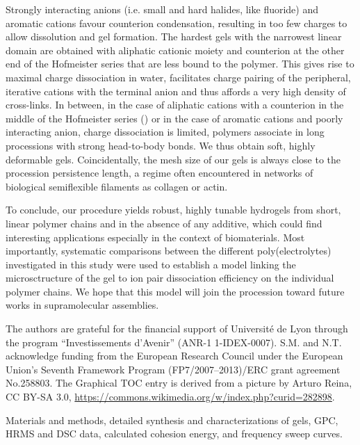 \documentclass[journal=jacsat,manuscript=article]{achemso}
\begin{document}
Strongly interacting anions (i.e. small and hard halides, like fluoride) and aromatic cations favour counterion condensation, resulting in too few charges to allow dissolution and gel formation. The hardest gels with the narrowest linear domain are obtained with aliphatic cationic moiety and counterion at the other end of the Hofmeister series that are less bound to the polymer. This gives rise to maximal charge dissociation in water, facilitates charge pairing of the peripheral, iterative cations with the terminal anion and thus affords a very high density of cross-links. In between, in the case of aliphatic cations with a counterion in the middle of the Hofmeister series () or in the case of aromatic cations and poorly interacting anion, charge dissociation is limited, polymers associate in long processions with strong head-to-body bonds. We thus obtain soft, highly deformable gels. Coincidentally, the mesh size of our gels is always close to the procession persistence length, a regime often encountered in networks of biological semiflexible filaments as collagen or actin\cite{Meng2016}.

To conclude, our procedure yields robust, highly tunable hydrogels from short, linear polymer chains and in the absence of any additive, which could find interesting applications especially in the context of biomaterials. Most importantly, systematic comparisons between the different poly(electrolytes) investigated in this study were used to establish a model linking the microsctructure of the gel to ion pair dissociation efficiency on the individual polymer chains. We hope that this model will join the procession toward future works in supramolecular assemblies.

\begin{acknowledgement}
The authors are grateful for the financial support of Université de Lyon through the program ``Investissements d'Avenir'' (ANR-1 1-IDEX-0007). S.M. and N.T. acknowledge funding from the European Research Council under the European Union's Seventh Framework Program (FP7/2007–2013)/ERC grant agreement No.258803. The Graphical TOC entry is derived from a picture by Arturo Reina, CC BY-SA 3.0, \url{https://commons.wikimedia.org/w/index.php?curid=282898}.
\end{acknowledgement}

\begin{suppinfo}

Materials and methods, detailed synthesis and characterizations of gels, GPC, HRMS and DSC data, calculated cohesion energy, and frequency sweep curves.

\end{suppinfo}


\end{document}
